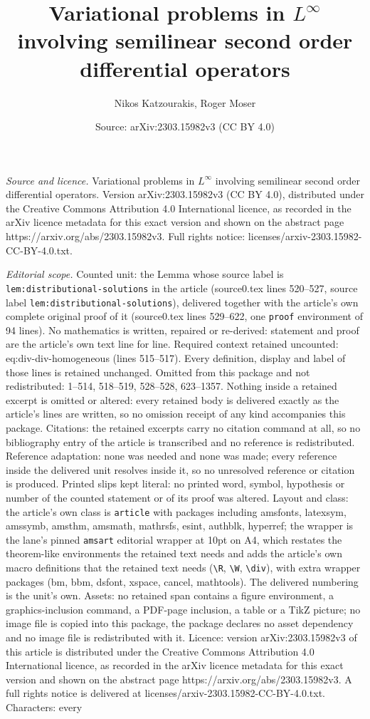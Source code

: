 \documentclass[10pt,a4paper]{amsart}
\title[Variational problems in $L^\infty$ involving semilinear seco]{Variational problems in $L^\infty$ involving semilinear second order differential operators}
\author{Nikos Katzourakis, Roger Moser}
\date{Source: arXiv:2303.15982v3 (CC BY 4.0)}
\begin{document}
\maketitle

\noindent\emph{Source and licence.} Variational problems in $L^\infty$ involving semilinear second order differential operators. Version arXiv:2303.15982v3 (CC BY 4.0), distributed under the Creative Commons Attribution 4.0 International licence, as recorded in the arXiv licence metadata for this exact version and shown on the abstract page https://arxiv.org/abs/2303.15982v3. Full rights notice: licenses/arxiv-2303.15982-CC-BY-4.0.txt.\par\smallskip

\noindent\textit{Editorial scope.} Counted unit: the Lemma whose source label is \texttt{lem:distributional-solutions} in the article (source0.tex lines 520--527, source label \texttt{lem:distributional-solutions}), delivered together with the article's own complete original proof of it (source0.tex lines 529--622, one \texttt{proof} environment of 94 lines). No mathematics is written, repaired or re-derived: statement and proof are the article's own text line for line. Required context retained uncounted: eq:div-div-homogeneous (lines 515--517). Every definition, display and label of those lines is retained unchanged. Omitted from this package and not redistributed: 1--514, 518--519, 528--528, 623--1357. Nothing inside a retained excerpt is omitted or altered: every retained body is delivered exactly as the article's lines are written, so no omission receipt of any kind accompanies this package. Citations: the retained excerpts carry no citation command at all, so no bibliography entry of the article is transcribed and no reference is redistributed. Reference adaptation: none was needed and none was made; every reference inside the delivered unit resolves inside it, so no unresolved reference or citation is produced. Printed slips kept literal: no printed word, symbol, hypothesis or number of the counted statement or of its proof was altered. Layout and class: the article's own class is \texttt{article} with packages including amsfonts, latexsym, amssymb, amsthm, amsmath, mathrsfs, esint, authblk, hyperref; the wrapper is the lane's pinned \texttt{amsart} editorial wrapper at 10pt on A4, which restates the theorem-like environments the retained text needs and adds the article's own macro definitions that the retained text needs (\texttt{\textbackslash R}, \texttt{\textbackslash W}, \texttt{\textbackslash div}), with extra wrapper packages (bm, bbm, dsfont, xspace, cancel, mathtools). The delivered numbering is the unit's own. Assets: no retained span contains a figure environment, a graphics-inclusion command, a PDF-page inclusion, a table or a TikZ picture; no image file is copied into this package, the package declares no asset dependency and no image file is redistributed with it. Licence: version arXiv:2303.15982v3 of this article is distributed under the Creative Commons Attribution 4.0 International licence, as recorded in the arXiv licence metadata for this exact version and shown on the abstract page https://arxiv.org/abs/2303.15982v3. A full rights notice is delivered at licenses/arxiv-2303.15982-CC-BY-4.0.txt. Characters: every 
\end{document}
